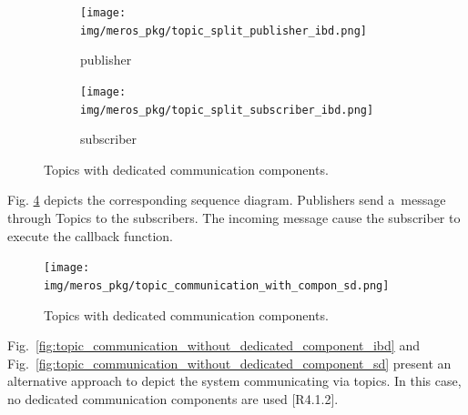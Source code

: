 \documentclass[11pt,oneside,a4paper]{report}
\begin{document}
	
	 \begin{figure}[H]
		\begin{subfigure}[b]{0.49\textwidth}
			\texttt{[image: img/meros\_pkg/topic\_split\_publisher\_ibd.png]}
			\caption{publisher}
			\label{fig:topic_split_publisher_ibd}
		\end{subfigure}
		\begin{subfigure}[b]{0.51\textwidth}
			\texttt{[image: img/meros\_pkg/topic\_split\_subscriber\_ibd.png]}
			\caption{subscriber}
			\label{fig:topic_split_subscriber_ibd}
		\end{subfigure}
		\caption{Topics with dedicated communication components.}
	\end{figure}
	

	
	
%
%
%
	
	\pagebreak
	
	Fig. \ref{fig:topic_communication_with_dedicated_component_sd} depicts the corresponding sequence diagram. Publishers send a~message through Topics to the subscribers. The incoming message cause the subscriber to execute the callback function. 
	
	\begin{figure}[H]
		\centering
		\begin{center}
			{\texttt{[image: img/meros\_pkg/topic\_communication\_with\_compon\_sd.png]}}
		\end{center}
		\caption{Topics with dedicated communication components.} 
		\label{fig:topic_communication_with_dedicated_component_sd}
	\end{figure}
		
	
	Fig.~\ref{fig:topic_communication_without_dedicated_component_ibd} and Fig.~\ref{fig:topic_communication_without_dedicated_component_sd} present an alternative approach to depict the system communicating via topics. In this case, no dedicated communication components are used [R4.1.2]. 
	
\end{document}
